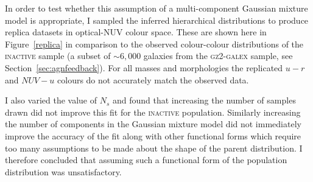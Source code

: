 

In order to test whether this assumption of a multi-component Gaussian mixture model is appropriate, I sampled the inferred hierarchical distributions to produce replica datasets in optical-NUV colour space. These are shown here in Figure~\ref{replica}  in comparison to the observed colour-colour distributions of the \textsc{inactive} sample (a subset of $\sim6,000$ galaxies from the \textsc{gz2-galex} sample, see Section~\ref{sec:agnfeedback}). For all masses and morphologies the replicated $u-r$ and $NUV-u$ colours do not accurately match the observed data. 


I also varied the value of $N_s$ and found that increasing the number of samples drawn did not improve this fit for the \textsc{inactive} population. Similarly increasing the number of components in the Gaussian mixture model did not immediately improve the accuracy of the fit along with other functional forms which require too many assumptions to be made about the shape of the parent distribution. I therefore concluded that assuming such a functional form of the population distribution was unsatisfactory. %

